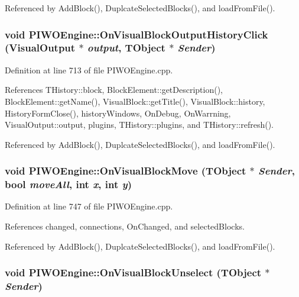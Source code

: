 Referenced by AddBlock(), DuplcateSelectedBlocks(), and loadFromFile().\hypertarget{classPIWOEngine_32a93f8cc49a3c9988674e99765d9cee}{
\subsubsection[OnVisualBlockOutputHistoryClick]{\setlength{\rightskip}{0pt plus 5cm}void PIWOEngine::OnVisualBlockOutputHistoryClick ({\bf VisualOutput} $\ast$ {\em output}, \/  TObject $\ast$ {\em Sender})}}
\label{classPIWOEngine_32a93f8cc49a3c9988674e99765d9cee}




Definition at line 713 of file PIWOEngine.cpp.

References THistory::block, BlockElement::getDescription(), BlockElement::getName(), VisualBlock::getTitle(), VisualBlock::history, HistoryFormClose(), historyWindows, OnDebug, OnWarrning, VisualOutput::output, plugins, THistory::plugins, and THistory::refresh().

Referenced by AddBlock(), DuplcateSelectedBlocks(), and loadFromFile().\hypertarget{classPIWOEngine_07f70dcb30a6077266626c7f52ce1667}{
\subsubsection[OnVisualBlockMove]{\setlength{\rightskip}{0pt plus 5cm}void PIWOEngine::OnVisualBlockMove (TObject $\ast$ {\em Sender}, \/  bool {\em moveAll}, \/  int {\em x}, \/  int {\em y})}}
\label{classPIWOEngine_07f70dcb30a6077266626c7f52ce1667}




Definition at line 747 of file PIWOEngine.cpp.

References changed, connections, OnChanged, and selectedBlocks.

Referenced by AddBlock(), DuplcateSelectedBlocks(), and loadFromFile().\hypertarget{classPIWOEngine_2baa1b7c8bb6b91e413b8cc2a7f5b8ea}{
\subsubsection[OnVisualBlockUnselect]{\setlength{\rightskip}{0pt plus 5cm}void PIWOEngine::OnVisualBlockUnselect (TObject $\ast$ {\em Sender})}}
\label{classPIWOEngine_2baa1b7c8bb6b91e413b8cc2a7f5b8ea}




